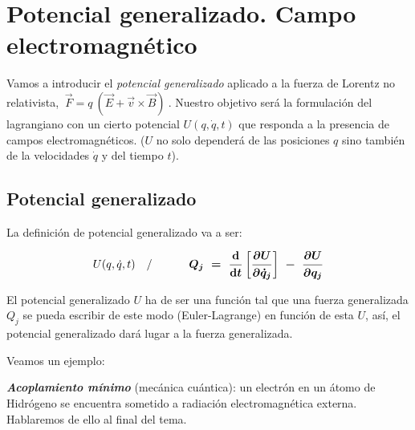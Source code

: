 \chapter{Potencial generalizado. Campo electromagnético}
\label{T7PotenGener}



\vspace{10mm}
\begin{adjustwidth}{50pt}{50pt}
\begin{ejemplo}
	Vamos a introducir el \emph{potencial generalizado} aplicado a la fuerza de Lorentz no relativista, $\ \overrightarrow F  =  q \ (\overrightarrow E + \vec v \times \overrightarrow B)\ $. Nuestro objetivo será la formulación del lagrangiano con un cierto potencial $U(q,\dot q,t)$ que responda a la presencia de campos electromagnéticos. ($U$ no solo dependerá de las posiciones $q$ sino también de la velocidades $\dot q$ y del tiempo $t$).
\end{ejemplo}
\end{adjustwidth}


\section{Potencial generalizado}
\vspace{5mm}

La definición de potencial generalizado va a ser:

\begin{equation}
\label{T7potengener}
U(q,\dot q, t) \quad / \qquad \quad \boldsymbol{ Q_j \ = \ \dv{t} \left[ \pdv{U}{\dot q_j} \right] \ - \ \pdv{U}{q_j} }	
\end{equation}


El potencial generalizado $U$ ha de ser una función tal que una fuerza generalizada $Q_j$ se pueda escribir de este modo (Euler-Lagrange) en función de esta $U$, así, el potencial generalizado dará lugar a la fuerza generalizada.

Veamos un ejemplo:

\begin{example}
	\textbf{\emph{Acoplamiento mínimo}} (mecánica cuántica): un electrón en un átomo de Hidrógeno se encuentra sometido a radiación electromagnética externa. Hablaremos de ello al final del tema.	
\end{example}

